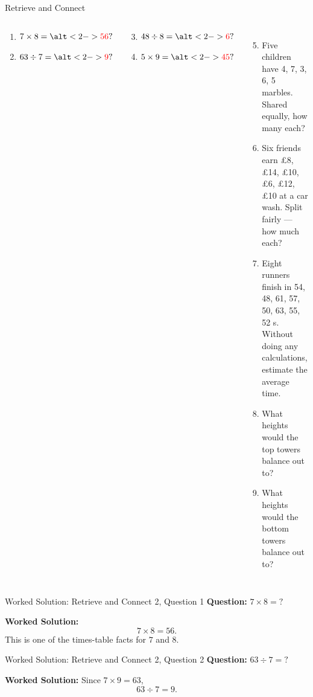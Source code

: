 \documentclass{beamer}
\newcommand{\ashow}[1]{\uncover<2->{\textcolor{red}{\small #1}}}
\newcommand{\ashowq}[1]{\alt<2->{\textcolor{red}{\small #1}}{?}}
\begin{document}
\begin{frame}{Retrieve and Connect}
\begin{columns}[T]
\footnotesize
\vspace{0.2em}
  \begin{multicols}{2}
  \begin{enumerate}
    \item $7 \times 8 = \ashowq{56}$
    \item $63 \div 7 = \ashowq{9}$
    \end{enumerate}
  \end{multicols}
  \begin{multicols}{2}
  \begin{enumerate}
  \setcounter{enumi}{2}
    \item $48 \div 8 = \ashowq{6}$
    \item $5 \times 9 = \ashowq{45}$
    \end{enumerate}
  \end{multicols}
  \begin{enumerate}
  \setcounter{enumi}{4}
  \item Five children have 4, 7, 3, 6, 5 marbles. Shared equally, how many each? \ashow{5 marbles}
  \item Six friends earn £8, £14, £10, £6, £12, £10 at a car wash. Split fairly — how much each? \ashow{\pounds10 each}
  \item Eight runners finish in 54, 48, 61, 57, 50, 63, 55, 52 s. Without doing any calculations, estimate the average time. \ashow{about 55 s}
  \item What heights would the top towers balance out to? \ashow{5 bricks high}
  \item What heights would the bottom towers balance out to? \ashow{4 bricks high}
\end{enumerate}

\end{columns}
\end{frame}

\begin{frame}{Worked Solution: Retrieve and Connect 2, Question 1}
\hypertarget{work-st2}{}
\textbf{Question:} \(7 \times 8 = ?\)

\textbf{Worked Solution:}
\[
7 \times 8 = 56.
\]
This is one of the times-table facts for \(7\) and \(8\).
\end{frame}

\begin{frame}{Worked Solution: Retrieve and Connect 2, Question 2}
\textbf{Question:} \(63 \div 7 = ?\)

\textbf{Worked Solution:}
Since \(7 \times 9 = 63\),
\[
63 \div 7 = 9.
\]
\end{frame}
\end{document}
